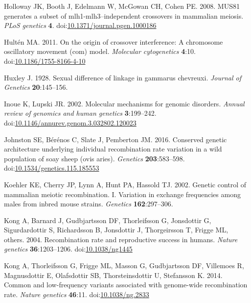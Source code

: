 \documentclass[
]{article}
\begin{document}
\leavevmode\hypertarget{ref-holloway2008mus81}{}%
Holloway JK, Booth J, Edelmann W, McGowan CH, Cohen PE. 2008. MUS81
generates a subset of mlh1-mlh3--independent crossovers in mammalian
meiosis. \emph{PLoS genetics} \textbf{4}.
doi:\href{https://doi.org/10.1371/journal.pgen.1000186}{10.1371/journal.pgen.1000186}

\leavevmode\hypertarget{ref-hulten2011_COM}{}%
Hultén MA. 2011. On the origin of crossover interference: A chromosome
oscillatory movement (com) model. \emph{Molecular cytogenetics}
\textbf{4}:10.
doi:\href{https://doi.org/10.1186/1755-8166-4-10}{10.1186/1755-8166-4-10}

\leavevmode\hypertarget{ref-huxley1928}{}%
Huxley J. 1928. Sexual difference of linkage in gammarus chevreuxi.
\emph{Journal of Genetics} \textbf{20}:145--156.

\leavevmode\hypertarget{ref-inoue2002}{}%
Inoue K, Lupski JR. 2002. Molecular mechanisms for genomic disorders.
\emph{Annual review of genomics and human genetics} \textbf{3}:199--242.
doi:\href{https://doi.org/10.1146/annurev.genom.3.032802.120023}{10.1146/annurev.genom.3.032802.120023}

\leavevmode\hypertarget{ref-johnston2016_soay}{}%
Johnston SE, Bérénos C, Slate J, Pemberton JM. 2016. Conserved genetic
architecture underlying individual recombination rate variation in a
wild population of soay sheep (ovis aries). \emph{Genetics}
\textbf{203}:583--598.
doi:\href{https://doi.org/10.1534/genetics.115.185553}{10.1534/genetics.115.185553}

\leavevmode\hypertarget{ref-koehler2002}{}%
Koehler KE, Cherry JP, Lynn A, Hunt PA, Hassold TJ. 2002. Genetic
control of mammalian meiotic recombination. I. Variation in exchange
frequencies among males from inbred mouse strains. \emph{Genetics}
\textbf{162}:297--306.

\leavevmode\hypertarget{ref-Kong2004}{}%
Kong A, Barnard J, Gudbjartsson DF, Thorleifsson G, Jonsdottir G,
Sigurdardottir S, Richardsson B, Jonsdottir J, Thorgeirsson T, Frigge
ML, others. 2004. Recombination rate and reproductive success in humans.
\emph{Nature genetics} \textbf{36}:1203--1206.
doi:\href{https://doi.org/10.1038/ng1445}{10.1038/ng1445}

\leavevmode\hypertarget{ref-Kong2014}{}%
Kong A, Thorleifsson G, Frigge ML, Masson G, Gudbjartsson DF, Villemoes
R, Magnusdottir E, Olafsdottir SB, Thorsteinsdottir U, Stefansson K.
2014. Common and low-frequency variants associated with genome-wide
recombination rate. \emph{Nature genetics} \textbf{46}:11.
doi:\href{https://doi.org/10.1038/ng.2833}{10.1038/ng.2833}
\end{document}
